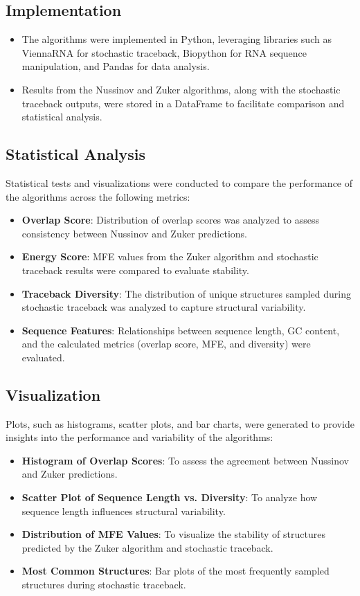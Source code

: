 \documentclass[10pt]{wlscirep}
\begin{document}
\subsection{Implementation}

\begin{itemize}
\item The algorithms were implemented in Python, leveraging libraries such as ViennaRNA for stochastic traceback, Biopython for RNA sequence manipulation, and Pandas for data analysis.
\item Results from the Nussinov and Zuker algorithms, along with the stochastic traceback outputs, were stored in a DataFrame to facilitate comparison and statistical analysis.
\end{itemize}

\subsection{Statistical Analysis}

Statistical tests and visualizations were conducted to compare the performance of the algorithms across the following metrics:
\begin{itemize}
\item \textbf{Overlap Score}: Distribution of overlap scores was analyzed to assess consistency between Nussinov and Zuker predictions.
\item \textbf{Energy Score}: MFE values from the Zuker algorithm and stochastic traceback results were compared to evaluate stability.
\item \textbf{Traceback Diversity}: The distribution of unique structures sampled during stochastic traceback was analyzed to capture structural variability.
\item \textbf{Sequence Features}: Relationships between sequence length, GC content, and the calculated metrics (overlap score, MFE, and diversity) were evaluated.
\end{itemize}

\subsection{Visualization}

Plots, such as histograms, scatter plots, and bar charts, were generated to provide insights into the performance and variability of the algorithms:
\begin{itemize}
\item \textbf{Histogram of Overlap Scores}: To assess the agreement between Nussinov and Zuker predictions.
\item \textbf{Scatter Plot of Sequence Length vs. Diversity}: To analyze how sequence length influences structural variability.
\item \textbf{Distribution of MFE Values}: To visualize the stability of structures predicted by the Zuker algorithm and stochastic traceback.
\item \textbf{Most Common Structures}: Bar plots of the most frequently sampled structures during stochastic traceback.
\end{itemize}
\end{document}

